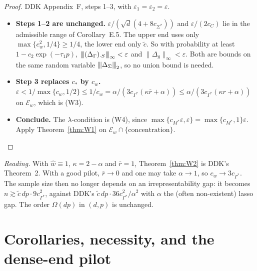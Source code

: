 \documentclass[11pt,a4paper]{article}
\numberwithin{equation}{section}
\theoremstyle{plain}
\theoremstyle{remark}
\newcommand{\opnorm}[1]{{\vert\kern-0.25ex\vert\kern-0.25ex\vert #1 \vert\kern-0.25ex\vert\kern-0.25ex\vert}}
\begin{document}
\begin{proof}
DDK Appendix~F, steps 1--3, with $\varepsilon_1=\varepsilon_2=\varepsilon$.
\begin{itemize}
  \item \textbf{Steps 1--2 are unchanged.} $\varepsilon/(\sqrt d(4+8c_{\Sigma^*}))$ and $\varepsilon/(2c_C)$ lie in the admissible range of Corollary~E.5. The upper end uses only $\max\{c_w^2,1/4\}\ge1/4$, the lower end only $\tilde c$. So with probability at least $1-c_2\exp(-\tau_1p)$, $\opnorm{(\Delta_\Gamma)_{\cdot S}}_\infty<\varepsilon$ and $\|\Delta_g\|_\infty<\varepsilon$. Both are bounds on the same random variable $\opnorm{\Delta_\Sigma}_2$, so no union bound is needed.
  \item \textbf{Step 3 replaces $c_*$ by $c_w$.} $\varepsilon<1/\max\{c_w,1/2\}\le1/c_w=\alpha/(3c_{\Gamma^*}(\kappa\bar r+\alpha))\le\alpha/(3c_{\Gamma^*}(\kappa r+\alpha))$ on $\mathcal E_w$, which is (W3).
  \item \textbf{Conclude.} The $\lambda$-condition is (W4), since $\max\{c_{M^*}\varepsilon,\varepsilon\}=\max\{c_{M^*},1\}\varepsilon$. Apply Theorem~\ref{thm:W1} on $\mathcal E_w\cap\{\text{concentration}\}$.\qedhere
\end{itemize}
\end{proof}

\emph{Reading.} With $\hat w\equiv1$, $\kappa=2-\alpha$ and $\bar r=1$, Theorem~\ref{thm:W2} is DDK's Theorem~2. With a good pilot, $\bar r\to0$ and one may take $\alpha\to1$, so $c_w\to3c_{\Gamma^*}$. The sample size then no longer depends on an irrepresentability gap: it becomes $n\gtrsim\tilde c\,dp\cdot9c_{\Gamma^*}^2$, against DDK's $\tilde c\,dp\cdot36c_{\Gamma^*}^2/\alpha^2$ with $\alpha$ the (often non-existent) lasso gap. The order $\Omega(dp)$ in $(d,p)$ is unchanged.
\section{Corollaries, necessity, and the dense-end pilot}\label{sec:corollaries}
\end{document}
